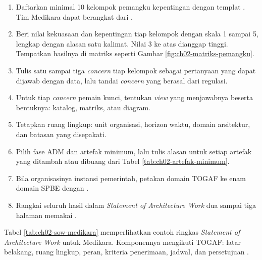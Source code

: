 \begin{enumerate}
  \item Daftarkan minimal 10 kelompok pemangku kepentingan dengan templat
        .
        Tim Medikara dapat berangkat dari
        .
  \item Beri nilai kekuasaan dan kepentingan tiap kelompok dengan skala 1
        sampai 5, lengkap dengan alasan satu kalimat. Nilai 3 ke atas
        dianggap tinggi. Tempatkan hasilnya di matriks seperti
        Gambar \ref{fig:ch02-matriks-pemangku}.
  \item Tulis satu sampai tiga \textit{concern} tiap kelompok sebagai
        pertanyaan yang dapat dijawab dengan data, lalu tandai
        \textit{concern} yang berasal dari regulasi.
  \item Untuk tiap \textit{concern} pemain kunci, tentukan \textit{view} yang
        menjawabnya beserta bentuknya: katalog, matriks, atau diagram.
  \item Tetapkan ruang lingkup: unit organisasi, horizon waktu, domain
        arsitektur, dan batasan yang disepakati.
  \item Pilih fase ADM dan artefak minimum, lalu tulis alasan untuk setiap
        artefak yang ditambah atau dibuang dari
        Tabel \ref{tab:ch02-artefak-minimum}.
  \item Bila organisasinya instansi pemerintah, petakan domain TOGAF ke enam
        domain SPBE dengan
        .
  \item Rangkai seluruh hasil dalam \textit{Statement of Architecture Work}
        dua sampai tiga halaman memakai
        .
\end{enumerate}

Tabel \ref{tab:ch02-sow-medikara} memperlihatkan contoh ringkas
\textit{Statement of Architecture Work} untuk Medikara. Komponennya mengikuti
TOGAF: latar belakang, ruang lingkup, peran, kriteria penerimaan, jadwal, dan
persetujuan \cite{c02-togaf-pocket}.

